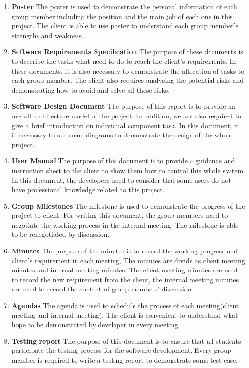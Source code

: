 \documentclass[11pt, a4paper]{report}
\begin{document}
\begin{enumerate}
	\item{\textbf{Poster} } The poster is used to demonstrate the personal information of each group member including the position and the main job of each one in this project. The client is able to use poster to understand each group member's strengths and weakness.
	\item{\textbf{Software Requirements Specification} } The purpose of these documents is to describe the tasks what need to do to reach the client's requirements. In these documents, it is also necessary to demonstrate the allocation of tasks to each group member. The client also requires analysing the potential risks and demonstrating how to avoid and solve all these risks. 
	\item{\textbf{Software Design Document} } The purpose of this report is to provide an overall architecture model of the project. In addition, we are also required to give a brief introduction on individual component task. In this document, it is necessary to use some diagrams to demonstrate the design of the whole project. 
	\item{\textbf{User Manual} } The purpose of this document is to provide a guidance and instruction sheet to the client to show them how to control this whole system. In this document, the developers need to consider that some users do not have professional knowledge related to this project.
	\item{\textbf{Group Milestones} } The milestone is used to demonstrate the progress of the project to client. For writing this document, the group members need to negotiate the working process in the internal meeting. The milestone is able to be renegotiated by discussion.
	\item{\textbf{Minutes} } The purpose of the minutes is to record the working progress and client's requirement in each meeting, The minutes are divide as client meeting minutes and internal meeting minutes. The client meeting minutes are used to record the new requirement from the client, the internal meeting minutes are used to record the content of group members' discussion.
	\item{\textbf{Agendas} } The agenda is used to schedule the process of each meeting(client meeting and internal meeting). The client is convenient to understand what hope to be demonstrated by developer in every meeting.
	\item{\textbf{Testing report} } The purpose of this document is to ensure that all students participate the testing process for the software development. Every group member is required to write a testing report to demonstrate some test case.  
\end{enumerate}
     
\end{document}
